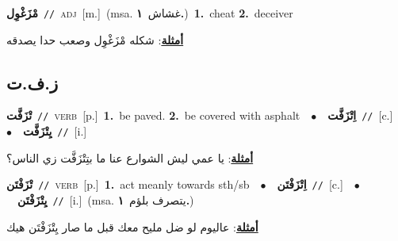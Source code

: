 \documentclass[10pt,a4paper,twoside]{article} %
\begin{document}
\begin{multicols}{2}
{\setlength\topsep{0pt}\textbf{\foreignlanguage{arabic}{مْزَغْوِل}}\ {\color{gray}\texttt{//}\color{black}}\ \textsc{adj}\ [m.]\ \color{gray}(msa. \foreignlanguage{arabic}{غشاش}~\foreignlanguage{arabic}{\textbf{١.}})\color{black}\ \textbf{1.}~cheat  \textbf{2.}~deceiver\  \begin{flushright}\color{gray}\foreignlanguage{arabic}{\textbf{\underline{\foreignlanguage{arabic}{أمثلة}}}: شكله مْزَغْوِل وصعب حدا يصدقه}\end{flushright}\color{black}} \vspace{2mm}

\vspace{-3mm}
\subsection*{\color{blue}\foreignlanguage{arabic}{ز.ف.ت}\color{blue}{}} 

{\setlength\topsep{0pt}\textbf{\foreignlanguage{arabic}{تْزَفَّت}}\ {\color{gray}\texttt{//}\color{black}}\ \textsc{verb}\ [p.]\ \textbf{1.}~be paved.  \textbf{2.}~be covered with asphalt\ \ $\bullet$\ \ \setlength\topsep{0pt}\textbf{\foreignlanguage{arabic}{اِتْزَفَّت}}\ {\color{gray}\texttt{//}\color{black}}\ [c.]\ \ $\bullet$\ \ \setlength\topsep{0pt}\textbf{\foreignlanguage{arabic}{يِتْزَفَّت}}\ {\color{gray}\texttt{//}\color{black}}\ [i.]\  \begin{flushright}\color{gray}\foreignlanguage{arabic}{\textbf{\underline{\foreignlanguage{arabic}{أمثلة}}}: يا عمي ليش الشوارع عنا ما بتِتْزَفَّت زي الناس؟}\end{flushright}\color{black}} \vspace{2mm}

{\setlength\topsep{0pt}\textbf{\foreignlanguage{arabic}{تْزَفْتَن}}\ {\color{gray}\texttt{//}\color{black}}\ \textsc{verb}\ [p.]\ \textbf{1.}~act meanly towards sth/sb\ \ $\bullet$\ \ \setlength\topsep{0pt}\textbf{\foreignlanguage{arabic}{اِتْزَفْتَن}}\ {\color{gray}\texttt{//}\color{black}}\ [c.]\ \ $\bullet$\ \ \setlength\topsep{0pt}\textbf{\foreignlanguage{arabic}{يِتْزَفْتَن}}\ {\color{gray}\texttt{//}\color{black}}\ [i.]\ \color{gray}(msa. \foreignlanguage{arabic}{يتصرف بلؤم}~\foreignlanguage{arabic}{\textbf{١.}})\color{black}\  \begin{flushright}\color{gray}\foreignlanguage{arabic}{\textbf{\underline{\foreignlanguage{arabic}{أمثلة}}}: عاليوم لو ضل مليح معك قبل ما صار يِتْزَفْتَن هيك}\end{flushright}\color{black}} \vspace{2mm}


\end{multicols}
\end{document}
